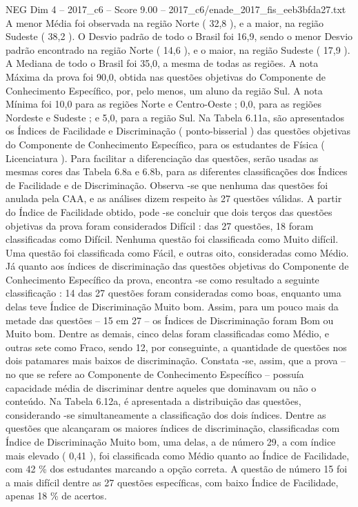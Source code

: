 \begin{textsample}{NEG Dim 4 – 2017\_c6 – Score 9.00 – 2017\_c6/enade\_2017\_fis\_eeb3bfda27.txt}
A menor Média foi observada na região Norte ( 32,8 ), e a maior, na região Sudeste ( 38,2 ).
O Desvio padrão de todo o Brasil foi 16,9, sendo o menor Desvio padrão encontrado na região Norte ( 14,6 ), e o maior, na região Sudeste ( 17,9 ).
A Mediana de todo o Brasil foi 35,0, a mesma de todas as regiões.
A nota Máxima da prova foi 90,0, obtida nas questões objetivas do Componente de Conhecimento Específico, por, pelo menos, um aluno da região Sul.
A nota Mínima foi 10,0 para as regiões Norte e Centro-Oeste ; 0,0, para as regiões Nordeste e Sudeste ; e 5,0, para a região Sul.
Na Tabela 6.11a, são apresentados os Índices de Facilidade e Discriminação ( ponto-bisserial ) das questões objetivas do Componente de Conhecimento Específico, para os estudantes de Física ( Licenciatura ).
Para facilitar a diferenciação das questões, serão usadas as mesmas cores das Tabela 6.8a e 6.8b, para as diferentes classificações dos Índices de Facilidade e de Discriminação.
Observa -se que nenhuma das questões foi anulada pela CAA, e as análises dizem respeito às 27 questões válidas.
A partir do Índice de Facilidade obtido, pode -se concluir que dois terços das questões objetivas da prova foram considerados Difícil : das 27 questões, 18 foram classificadas como Difícil.
Nenhuma questão foi classificada como Muito difícil.
Uma questão foi classificada como Fácil, e outras oito, consideradas como Médio.
Já quanto aos índices de discriminação das questões objetivas do Componente de Conhecimento Específico da prova, encontra -se como resultado a seguinte classificação : 14 das 27 questões foram consideradas como boas, enquanto uma delas teve Índice de Discriminação Muito bom.
Assim, para um pouco mais da metade das questões – 15 em 27 – os Índices de Discriminação foram Bom ou Muito bom.
Dentre as demais, cinco delas foram classificadas como Médio, e outras sete como Fraco, sendo 12, por conseguinte, a quantidade de questões nos dois patamares mais baixos de discriminação.
Constata -se, assim, que a prova – no que se refere ao Componente de Conhecimento Específico – possuía capacidade média de discriminar dentre aqueles que dominavam ou não o conteúdo.
Na Tabela 6.12a, é apresentada a distribuição das questões, considerando -se simultaneamente a classificação dos dois índices.
Dentre as questões que alcançaram os maiores índices de discriminação, classificadas com Índice de Discriminação Muito bom, uma delas, a de número 29, a com índice mais elevado ( 0,41 ), foi classificada como Médio quanto ao Índice de Facilidade, com 42 \% dos estudantes marcando a opção correta.
A questão de número 15 foi a mais difícil dentre as 27 questões específicas, com baixo Índice de Facilidade, apenas 18 \% de acertos.

\end{textsample}
